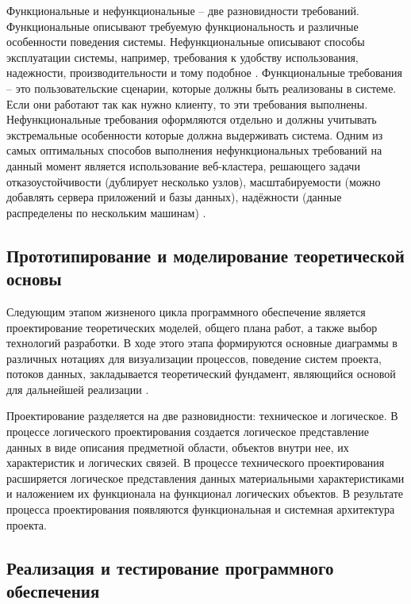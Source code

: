 Функциональные и нефункциональные -- две разновидности требований. Функциональные описывают требуемую функциональность и различные особенности поведения системы. Нефункциональные описывают способы эксплуатации системы, например, требования к удобству использования, надежности, производительности и тому подобное \cite{17, 18}.
Функциональные требования -- это пользовательские сценарии, которые должны быть реализованы в системе. Если они работают так как нужно клиенту, то эти требования выполнены. 
Нефункциональные требования оформляются отдельно и должны учитывать экстремальные особенности которые должна выдерживать система. Одним из самых оптимальных способов выполнения нефункциональных требований на данный момент является использование веб-кластера, решающего задачи отказоустойчивости (дублирует несколько узлов), масштабируемости (можно добавлять сервера приложений и базы данных), надёжности (данные распределены по нескольким машинам) \cite{15, 16}.
\subsection{Прототипирование и моделирование теоретической основы}
Следующим этапом жизненого цикла программного обеспечение является проектирование теоретических моделей, общего плана работ, а также выбор технологий разработки. В ходе этого этапа формируются основные диаграммы в различных нотациях для визуализации процессов, поведение систем проекта, потоков данных, закладывается теоретический фундамент, являющийся основой для дальнейшей реализации \cite{4, 11}.

Проектирование разделяется на две разновидности: техническое и логическое. В процессе логического проектирования создается логическое представление данных в виде описания предметной области, объектов внутри нее, их характеристик и логических связей. В процессе технического проектирования расширяется логическое представления данных материальными характеристиками и наложением их функционала на функционал логических объектов. В результате процесса проектирования появляются функциональная и системная архитектура проекта.

\subsection{Реализация и тестирование программного обеспечения}

